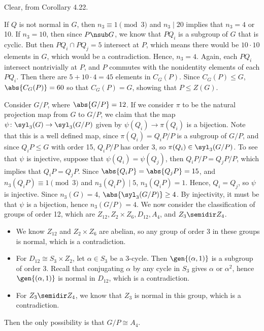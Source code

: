 \begin{solenum}
    \item Clear, from Corollary 4.22.
    \item If $Q$ is not normal in $G$, then $n_3 \equiv 1 \pmod 3$ and $n_3 \mid 20$ implies that $n_3 = 4$ or 10.
	If $n_3 = 10$, then since $P \nsub G$, we know that $PQ_i$ is a subgroup of $G$ that is cyclic.
	But then $PQ_i \cap PQ_j = 5$ intersect at $P$, which means there would be $10 \cdot 10$ elements in $G$, which would be a contradiction.
	Hence, $n_3 = 4$.
	Again, each $PQ_i$ intersect nontrivially at $P$, and $P$ commutes with the nonidentity elements of each $PQ_i$.
	Then there are $5 + 10 \cdot 4 = 45$ elements in $C_G(P)$.
	Since $C_G(P) \leq G$, $\abs{C_G(P)} = 60$ so that $C_G(P) = G$, showing that $P \leq Z(G)$.
    
    Consider $G/P$, where $\abs{G/P} = 12$.
	If we consider $\pi$ to be the natural projection map from $G$ to $G/P$, we claim that the map $\psi \colon \syl_3(G) \to \syl_3(G/P)$ given by $\psi(Q_i) \to \pi(Q_i)$ is a bijection.
	Note that this is a well defined map, since $\pi(Q_i) = Q_iP/P$ is a subgroup of $G/P$, and since $Q_iP \leq G$ with order 15, $Q_iP/P$ has order 3, so $\pi(Q_i) \in \syl_3(G/P)$.
	To see that $\psi$ is injective, suppose that $\psi(Q_i) = \psi(Q_j)$, then $Q_iP/P = Q_jP/P$, which implies that $Q_iP = Q_jP$.
	Since $\abs{Q_iP} = \abs{Q_jP} = 15$, and $n_3(Q_iP) \equiv 1 \pmod 3$ and $n_3(Q_iP) \mid 5$, $n_3(Q_iP) = 1$.
	Hence, $Q_i = Q_j$, so $\psi$ is injective.
	Since $n_3(G) = 4$, $\abs{\syl_3(G/P)} \geq 4$.
	By injectivity, it must be that $\psi$ is a bijection, hence $n_3(G/P) = 4$.
	We now consider the classification of groups of order 12, which are $Z_{12}, Z_2 \times Z_6, D_{12}, A_4$, and $Z_3 \semidir Z_4$.
    \begin{itemize}
        \item We know $Z_{12}$ and $Z_2 \times Z_6$ are abelian, so any group of order 3 in these groups is normal, which is a contradiction.
        \item For $D_{12} \cong S_3 \times Z_2$, let $\alpha \in S_3$ be a 3-cycle.
	Then $\gen{(\alpha, 1)}$ is a subgroup of order 3.
	Recall that conjugating $\alpha$ by any cycle in $S_3$ gives $\alpha$ or $\alpha^2$, hence $\gen{(\alpha, 1)}$ is normal in $D_{12}$, which is a contradiction.
        \item For $Z_3 \semidir Z_4$, we know that $Z_3$ is normal in this group, which is a contradiction.
    \end{itemize}
    Then the only possibility is that $G/P \cong A_4$.


\end{solenum}
